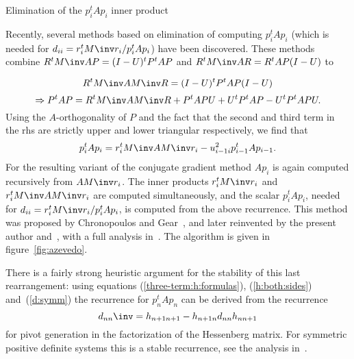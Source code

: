 \documentclass[11pt]{artikel3}
\begin{document}
\begin{Outline}
 {Elimination of the $p_i^tAp_i$ inner product}
\label{sec:elim-pap}

Recently, several methods based on elimination of computing
$p_i^tAp_i$ (which is needed for $d_{ii}=r_i^tM\inv r_i/p_i^tAp_i$)
have been discovered.  These methods combine $R^tM\inv
AP=(I-U)^tP^tAP$ and $R^tM\inv AR=R^tAP(I-U)$ to
\begin{comment}
\[ (I-U)^tP^tAP=R^tAR+R^tAPU \]
and consider the diagonal of the left and right hand side. From
\begin{equation}
        p_i^tAp_i = r_i^tAr_i+r_i^tAp_{i-1}u_{i-1i}
        \label{eq:eijkhout}\end{equation}
we see that $p_i^tAp_i$ can be computed from $r_i^tAr_i$ and
$r_i^tAp_{i-1}=p_{i-1}^t(Ar_i)$. Hence, one extra inner product is
needed, and $Ar_i$ is computed instead of~$Ap_i$. This latter vector
can be computed recursively:
\[ Ap_{i+1}=AM\inv r_{i+1}+\sum_{k=1}^iAp_ku_{ki+1} \]
where the method now computes a matrix-vector product $AM\inv r_i$.
This method was proposed by Eijkhout~\cite{Eij:lawn51}.

Expanding $R^tM\inv AM\inv R$ one step further into $(I-U)^tP^tAP(I-U)$ gives
\end{comment}
\[ R^tM\inv AM\inv R=(I-U)^tP^tAP(I-U) \]
\[ \Rightarrow P^tAP=R^tM\inv AM\inv R+P^tAPU+U^tP^tAP-U^tP^tAPU. \]
Using the $A$-orthogonality of $P$ and the fact that the second and
third term
in the rhs are strictly upper and lower triangular respectively,
we find that 
\begin{equation}
        p_i^tAp_i=r_i^tM\inv AM\inv r_i-u_{i-1i}^2p_{i-1}^tAp_{i-1}.
        \label{eq:azevedo}\end{equation}
For the resulting variant of the conjugate gradient method
$Ap_i$ is again computed recursively from $AM\inv r_i$.
The inner products $r_i^tM\inv r_i$ and $r_i^tM\inv AM\inv r_i$ are computed
simultaneously, and the scalar $p_i^tAp_i$,
needed for $d_{ii}=r_i^tM\inv r_i/p_i^tAp_i$,
is computed from the above recurrence.
This method was proposed by Chronopoulos and Gear~\cite{ChGe:sstep},
and later reinvented by the present author and~\cite{DAzRo:unsync},
with a full analysis in~\cite{DAzEijRo:lawn56}.
The algorithm is given in figure~\ref{fig:azevedo}.


There is a fairly strong heuristic argument for the stability of this last
rearrangement: using equations (\ref{three-term:h:formulas}),
(\ref{h:both:sides}) and~(\ref{d:symm}) 
the recurrence for $p_n^tAp_n$ can be derived from the recurrence
\[ d_{nn}\inv=h_{n+1n+1}-h_{n+1n}d_{nn}h_{nn+1} \]
for pivot generation in the factorization of the Hessenberg matrix.
For symmetric positive definite systems this is a stable recurrence,
see the analysis in~\cite{DAzEijRo:lawn56}.


\end{Outline}
\end{document}
